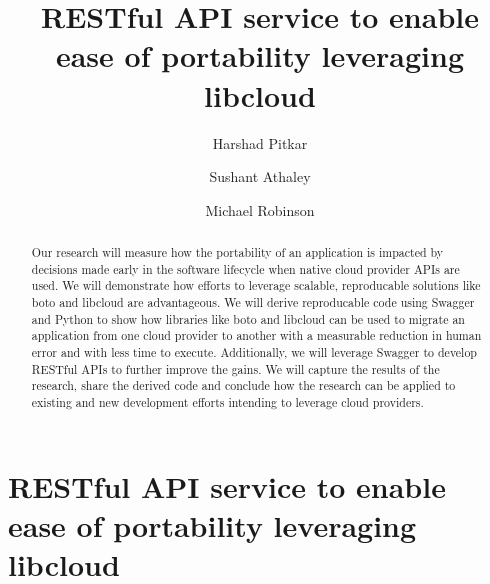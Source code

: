 
\title{RESTful API service to enable ease of portability leveraging libcloud}


\author{Harshad Pitkar}

\author{Sushant Athaley}

\author{Michael Robinson}


\renewcommand{\shortauthors}{H. Pitkar, S. Athaley, M. Robinson}


\begin{abstract}
Our research will measure how the portability of an application is
impacted by decisions made early in the software lifecycle when native
cloud provider APIs are used. We will demonstrate how efforts to
leverage scalable, reproducable solutions like boto and libcloud are
advantageous. We will derive reproducable code using Swagger and Python
to show how libraries like boto and libcloud can be used to migrate an
application from one cloud provider to another with a measurable
reduction in human error and with less time to execute. Additionally, we
will leverage Swagger to develop RESTful APIs to further improve the
gains. We will capture the results of the research, share the derived
code and conclude how the research can be applied to existing and new
development efforts intending to leverage cloud providers. 
\end{abstract}



\maketitle

\section{RESTful API service to enable ease of portability leveraging 
libcloud}\label{restful-api-service-to-enable-ease-of-portability-
leveraging-libcloud}


